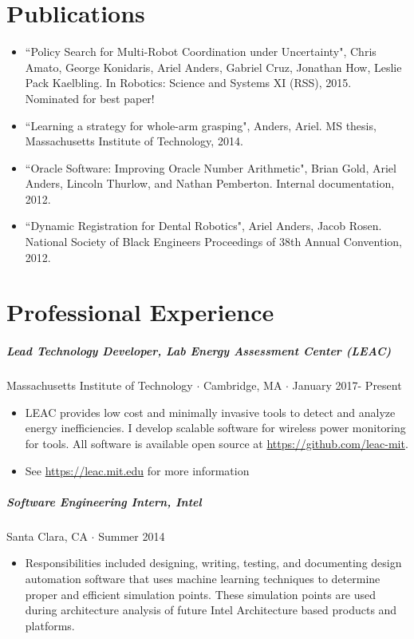 \documentclass[10pt,letterpaper]{article}
\begin{document}
\section*{Publications}
\begin{itemize}
    \item ``Policy Search for Multi-Robot Coordination under Uncertainty", Chris Amato, George Konidaris, Ariel Anders, Gabriel Cruz, Jonathan How, Leslie Pack Kaelbling. In Robotics: Science and Systems XI (RSS), 2015. Nominated for best paper!
    \item ``Learning a strategy for whole-arm grasping", Anders, Ariel. MS thesis, Massachusetts Institute of Technology, 2014.
    \item ``Oracle Software: Improving Oracle Number Arithmetic", Brian Gold, Ariel Anders, Lincoln Thurlow, and Nathan Pemberton. Internal documentation, 2012.
    \item ``Dynamic Registration for Dental Robotics", Ariel Anders, Jacob Rosen. National Society of Black Engineers Proceedings of 38th Annual Convention, 2012. 
\end{itemize}
\fi 

\section*{Professional Experience}
\subparagraph{Lead Technology Developer, Lab Energy Assessment Center (LEAC)}
Massachusetts Institute of Technology $\cdot$ Cambridge, MA $\cdot$ January 2017- Present
\begin{itemize}
\item LEAC provides low cost and minimally invasive tools to detect and analyze energy inefficiencies. I develop scalable software for wireless power monitoring for tools. All software is available open source at \url{https://github.com/leac-mit}.
\item See \url{https://leac.mit.edu} for more information
\end{itemize}

\subparagraph{Software Engineering Intern, Intel}
Santa Clara, CA $\cdot$ Summer 2014
\begin{itemize}
\item Responsibilities included designing, writing, testing, and documenting design automation software that uses machine learning techniques to determine proper and efficient simulation points. These simulation points are used during architecture analysis of future Intel Architecture based products and platforms.
\end{itemize}
\end{document}
